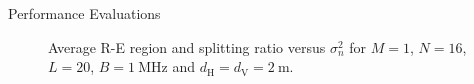 \documentclass[journal]{IEEEtran}
\begin{document}
\begin{section}{Performance Evaluations}
		\begin{figure}[!t]
			\centering
			\caption{Average R-E region and splitting ratio versus $\sigma_n^2$ for $M=1$, $N=16$, $L=20$, $B=\SI{1}{\MHz}$ and $d_{\mathrm{H}}=d_{\mathrm{V}}=\SI{2}{\meter}$.}
		\end{figure}


\end{section}
\end{document}

